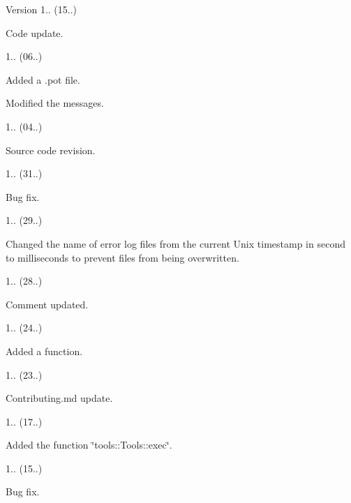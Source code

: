 \begin{DoxyVersion}{Version}
1.. (15..)
\begin{DoxyItemize}
\item Code update. 
\end{DoxyItemize}

1.. (06..)
\begin{DoxyItemize}
\item Added a .pot file.
\item Modified the messages. 
\end{DoxyItemize}

1.. (04..)
\begin{DoxyItemize}
\item Source code revision. 
\end{DoxyItemize}

1.. (31..)
\begin{DoxyItemize}
\item Bug fix. 
\end{DoxyItemize}

1.. (29..)
\begin{DoxyItemize}
\item Changed the name of error log files from the current Unix timestamp in second to milliseconds to prevent files from being overwritten. 
\end{DoxyItemize}

1.. (28..)
\begin{DoxyItemize}
\item Comment updated. 
\end{DoxyItemize}

1.. (24..)
\begin{DoxyItemize}
\item Added a function. 
\end{DoxyItemize}

1.. (23..)
\begin{DoxyItemize}
\item Contributing.\+md update. 
\end{DoxyItemize}

1.. (17..)
\begin{DoxyItemize}
\item Added the function \char`\"{}tools\+::\+Tools\+::exec\char`\"{}. 
\end{DoxyItemize}

1.. (15..)
\begin{DoxyItemize}
\item Bug fix. 
\end{DoxyItemize}


\end{DoxyVersion}
